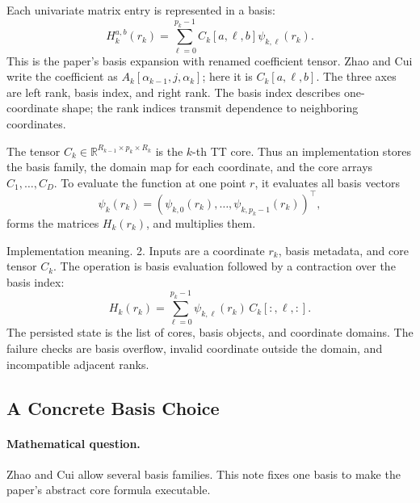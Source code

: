 \documentclass[11pt]{article}
\numberwithin{equation}{section}
\newcommand{\R}{\mathbb R}
\begin{document}
Each univariate matrix entry is represented in a basis:
\begin{equation}
    H_k^{a,b}(r_k)
    =
    \sum_{\ell=0}^{p_k-1}
    C_k[a,\ell,b]\psi_{k,\ell}(r_k).
    \label{eq:p24-tt-3}
\end{equation}
This is the paper's basis expansion with renamed coefficient tensor.  Zhao and Cui \cite{zhao2024ttsequential}
write the coefficient as \(A_k[\alpha_{k-1},j,\alpha_k]\); here it is
\(C_k[a,\ell,b]\).  The three axes are left rank, basis index, and right rank.
The basis index describes one-coordinate shape; the rank indices transmit
dependence to neighboring coordinates.

The tensor \(C_k\in\R^{R_{k-1}\times p_k\times R_k}\) is the \(k\)-th TT core.
Thus an implementation stores the basis family, the domain map for each
coordinate, and the core arrays \(C_1,\ldots,C_D\).  To evaluate the function at
one point \(r\), it evaluates all basis vectors
\[
    \psi_k(r_k)
    =
    (\psi_{k,0}(r_k),\ldots,\psi_{k,p_k-1}(r_k))^\top,
\]
forms the matrices \(H_k(r_k)\), and multiplies them.

Implementation meaning. 2.  Inputs are a coordinate \(r_k\), basis
metadata, and core tensor \(C_k\).  The operation is basis evaluation followed
by a contraction over the basis index:
\begin{equation}
    H_k(r_k)=\sum_{\ell=0}^{p_k-1}\psi_{k,\ell}(r_k)\,C_k[:,\ell,:].
    \label{eq:p24-tt-3a}
\end{equation}
The persisted state is the list of cores, basis objects, and coordinate
domains.  The failure checks are basis overflow, invalid coordinate outside the
domain, and incompatible adjacent ranks.

\subsection{A Concrete Basis Choice}

\paragraph{Mathematical question.}
Zhao and Cui \cite{zhao2024ttsequential} allow several basis families.  This note fixes one basis to make the
paper's abstract core formula executable.
\end{document}
